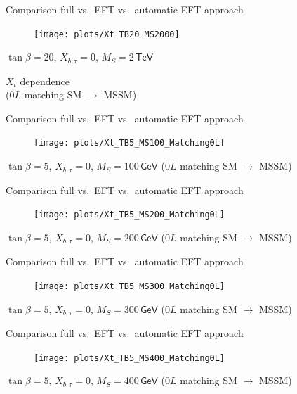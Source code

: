 \documentclass[hyperref={pdfpagelabels=false},ngerman]{beamer}
\newcommand{\eh}[1]{\,\mathsf{#1}}
\begin{document}
\begin{frame}[noframenumbering]{Comparison full vs.\ EFT vs.\ automatic EFT approach}
  \begin{figure}
    \centering
    \texttt{[image: plots/Xt\_TB20\_MS2000]}
  \end{figure}
  $\tan\beta = 20$, $X_{b,\tau} = 0$, $M_S = 2\eh{TeV}$
\end{frame}


\begin{frame}[noframenumbering]
  \begin{center}
    {\Large $X_t$ dependence}\\[1em]
    ($0L$ matching SM $\rightarrow$ MSSM)
  \end{center}
\end{frame}

\begin{frame}[noframenumbering]{Comparison full vs.\ EFT vs.\ automatic EFT approach}
  \begin{figure}
    \centering
    \texttt{[image: plots/Xt\_TB5\_MS100\_Matching0L]}
  \end{figure}
  $\tan\beta = 5$, $X_{b,\tau} = 0$, $M_S = 100\eh{GeV}$ ($0L$ matching SM $\rightarrow$ MSSM)
\end{frame}

\begin{frame}[noframenumbering]{Comparison full vs.\ EFT vs.\ automatic EFT approach}
  \begin{figure}
    \centering
    \texttt{[image: plots/Xt\_TB5\_MS200\_Matching0L]}
  \end{figure}
  $\tan\beta = 5$, $X_{b,\tau} = 0$, $M_S = 200\eh{GeV}$ ($0L$ matching SM $\rightarrow$ MSSM)
\end{frame}

\begin{frame}[noframenumbering]{Comparison full vs.\ EFT vs.\ automatic EFT approach}
  \begin{figure}
    \centering
    \texttt{[image: plots/Xt\_TB5\_MS300\_Matching0L]}
  \end{figure}
  $\tan\beta = 5$, $X_{b,\tau} = 0$, $M_S = 300\eh{GeV}$ ($0L$ matching SM $\rightarrow$ MSSM)
\end{frame}

\begin{frame}[noframenumbering]{Comparison full vs.\ EFT vs.\ automatic EFT approach}
  \begin{figure}
    \centering
    \texttt{[image: plots/Xt\_TB5\_MS400\_Matching0L]}
  \end{figure}
  $\tan\beta = 5$, $X_{b,\tau} = 0$, $M_S = 400\eh{GeV}$ ($0L$ matching SM $\rightarrow$ MSSM)
\end{frame}
\end{document}
